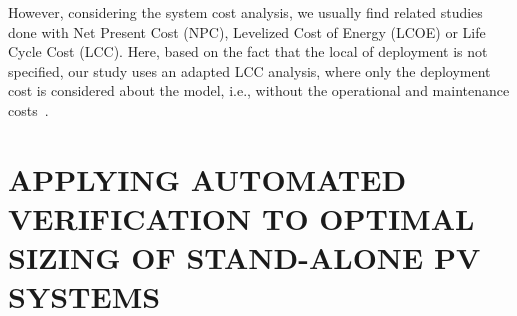 \documentclass[10pt,conference]{IEEEtran}
\begin{document}
However, considering the system cost analysis, we usually find related studies done with Net Present Cost (NPC), Levelized Cost of Energy (LCOE) or Life Cycle Cost (LCC). Here, based on the fact that the local of deployment is not specified, our study uses an adapted LCC analysis, where only the deployment cost is considered about the model, i.e., without the operational and maintenance costs~\cite{Alsadi2018}.
\section{APPLYING AUTOMATED VERIFICATION TO OPTIMAL SIZING OF STAND-ALONE PV SYSTEMS}
\end{document}

